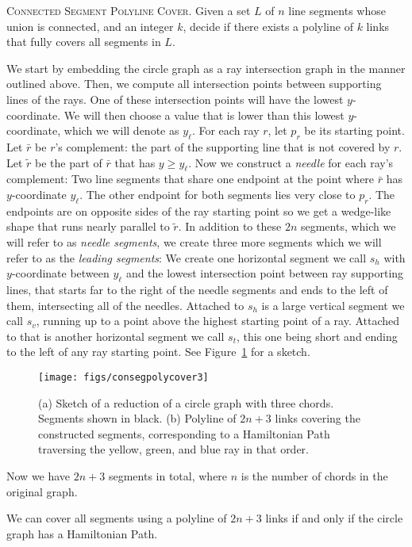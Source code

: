 \documentclass[]{llncs}
\newcommand{\consegcover}{\textsc{Connected Segment Polyline Cover}\xspace}
\begin{document}
\begin {problem} \consegcover.
  Given a set $L$ of $n$ line segments whose union is connected, and an integer $k$,
  decide if there exists a polyline of $k$ links that fully covers all segments in $L$.
\end {problem}

We start by embedding the circle graph as a ray intersection graph in the manner outlined above. Then, we compute all intersection points between supporting lines of the rays. One of these intersection points will have the lowest \(y\)-coordinate. We will then choose a value that is lower than this lowest $y$-coordinate, which we will denote as $y_\ell$. For each ray $r$, let $p_r$ be its starting point. Let $\bar r$ be $r$'s complement: the part of the supporting line that is not covered by $r$. Let $\tilde r$ be the part of $\bar r$ that has $y \geq y_\ell$. Now we construct a \emph{needle} for each ray's complement: Two line segments that share one endpoint at the point where $\bar r$ has $y$-coordinate $y_\ell$. The other endpoint for both segments lies very close to $p_r$. The endpoints are on opposite sides of the ray starting point so we get a wedge-like shape that runs nearly parallel to $\tilde r$. In addition to these $2n$ segments, which we will refer to as \emph{needle segments}, we create three more segments which we will refer to as the \emph{leading segments}: We create one horizontal segment we call $s_h$ with $y$-coordinate between $y_\ell$ and the lowest intersection point between ray supporting lines, that starts far to the right of the needle segments and ends to the left of them, intersecting all of the needles. Attached to $s_h$ is a large vertical segment we call $s_v$, running up to a point above the highest starting point of a ray. Attached to that is another horizontal segment we call $s_t$, this one being short and ending to the left of any ray starting point. See Figure~\ref{fig:consegpolycover} for a sketch. 

\begin{figure}[t]
\centering
\texttt{[image: figs/consegpolycover3]}
\caption{(a) Sketch of a reduction of a circle graph with three chords. Segments shown in black. (b) Polyline of $2n+3$ links covering the constructed segments, corresponding to a Hamiltonian Path traversing the yellow, green, and blue ray in that order.}
\label{fig:consegpolycover}
\end{figure}


Now we have $2n+3$ segments in total, where $n$ is the number of chords in the original graph.
\begin {lemma}
We can cover all segments using a polyline of $2n+3$ links if and only if the circle graph has a Hamiltonian Path.
\end {lemma}
\end{document}
